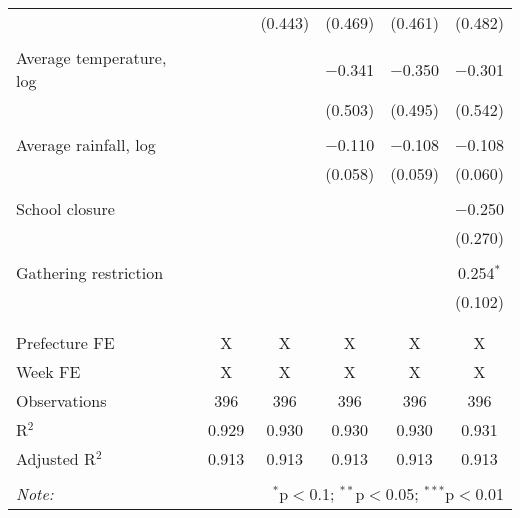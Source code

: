 \begin{table}[!htbp]
\begin{tabular}{@{\extracolsep{5pt}}lccccc}
  &  & (0.443) & (0.469) & (0.461) & (0.482) \\ 
  & & & & & \\ 
 Average temperature, log &  &  & $-$0.341 & $-$0.350 & $-$0.301 \\ 
  &  &  & (0.503) & (0.495) & (0.542) \\ 
  & & & & & \\ 
 Average rainfall, log &  &  & $-$0.110 & $-$0.108 & $-$0.108 \\ 
  &  &  & (0.058) & (0.059) & (0.060) \\ 
  & & & & & \\ 
 School closure &  &  &  &  & $-$0.250 \\ 
  &  &  &  &  & (0.270) \\ 
  & & & & & \\ 
 Gathering restriction &  &  &  &  & 0.254$^{*}$ \\ 
  &  &  &  &  & (0.102) \\ 
  & & & & & \\ 
\hline \\[-1.8ex] 
Prefecture FE & X & X & X & X & X \\ 
Week FE & X & X & X & X & X \\ 
Observations & 396 & 396 & 396 & 396 & 396 \\ 
R$^{2}$ & 0.929 & 0.930 & 0.930 & 0.930 & 0.931 \\ 
Adjusted R$^{2}$ & 0.913 & 0.913 & 0.913 & 0.913 & 0.913 \\ 
\hline 
\hline \\[-1.8ex] 
\textit{Note:}  & \multicolumn{5}{r}{$^{*}$p$<$0.1; $^{**}$p$<$0.05; $^{***}$p$<$0.01} \\ 
\end{tabular} 
\end{table} 
